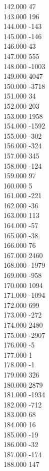 { 142.000	47 \\
 143.000	196 \\
 144.000	-143 \\
 145.000	-146 \\
 146.000	43 \\
 147.000	555 \\
 148.000	-1003 \\
 149.000	4047 \\
 150.000	-3718 \\
 151.000	34 \\
 152.000	203 \\
 153.000	1958 \\
 154.000	-1592 \\
 155.000	-302 \\
 156.000	-324 \\
 157.000	345 \\
 158.000	-124 \\
 159.000	97 \\
 160.000	5 \\
 161.000	-221 \\
 162.000	-36 \\
 163.000	113 \\
 164.000	-57 \\
 165.000	-38 \\
 166.000	76 \\
 167.000	2460 \\
 168.000	-1979 \\
 169.000	-958 \\
 170.000	1094 \\
 171.000	-1094 \\
 172.000	699 \\
 173.000	-272 \\
 174.000	2480 \\
 175.000	-2907 \\
 176.000	-5 \\
 177.000	1 \\
 178.000	-1 \\
 179.000	326 \\
 180.000	2879 \\
 181.000	-1934 \\
 182.000	-712 \\
 183.000	68 \\
 184.000	16 \\
 185.000	-19 \\
 186.000	-32 \\
 187.000	-174 \\
 188.000	147 \\
}
